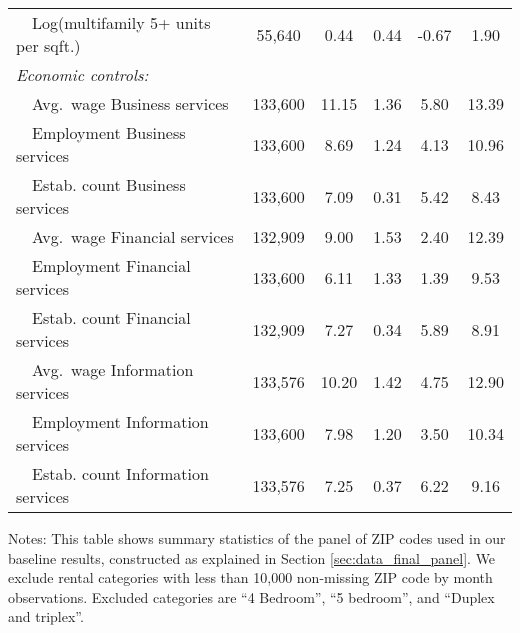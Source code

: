 \begin{table}[hbt!]
\begin{tabular}{@{}lccccc@{}}
        $\quad$Log(multifamily 5+ units per sqft.)    & 55,640  & 0.44  & 0.44  & -0.67  & 1.90  \\[.3em]
        \textit{Economic controls:}                   &       &       &       &       &       \\
        $\quad$Avg.\ wage Business services           & 133,600  & 11.15  & 1.36  & 5.80  & 13.39  \\
        $\quad$Employment Business services           & 133,600  & 8.69  & 1.24  & 4.13  & 10.96  \\
        $\quad$Estab. count Business services         & 133,600  & 7.09  & 0.31  & 5.42  & 8.43  \\
        $\quad$Avg.\ wage Financial services          & 132,909  & 9.00  & 1.53  & 2.40  & 12.39  \\
        $\quad$Employment Financial services          & 133,600  & 6.11  & 1.33  & 1.39  & 9.53  \\
        $\quad$Estab. count Financial services        & 132,909  & 7.27  & 0.34  & 5.89  & 8.91  \\
        $\quad$Avg.\ wage Information services        & 133,576  & 10.20  & 1.42  & 4.75  & 12.90  \\
        $\quad$Employment Information services        & 133,600  & 7.98  & 1.20  & 3.50  & 10.34  \\
        $\quad$Estab. count Information services      & 133,576  & 7.25  & 0.37  & 6.22  & 9.16  \\ \bottomrule
    \end{tabular}

    \begin{minipage}{.95\textwidth} \footnotesize
        \vspace{2mm}
        Notes: This table shows summary statistics of the panel of ZIP codes 
        used in our baseline results, constructed as explained in Section 
        \ref{sec:data_final_panel}.
        We exclude rental categories with less than 10,000 non-missing ZIP code 
        by month observations.
        Excluded categories are ``4 Bedroom'', ``5 bedroom'', and 
        ``Duplex and triplex''.
    \end{minipage}
\end{table}
